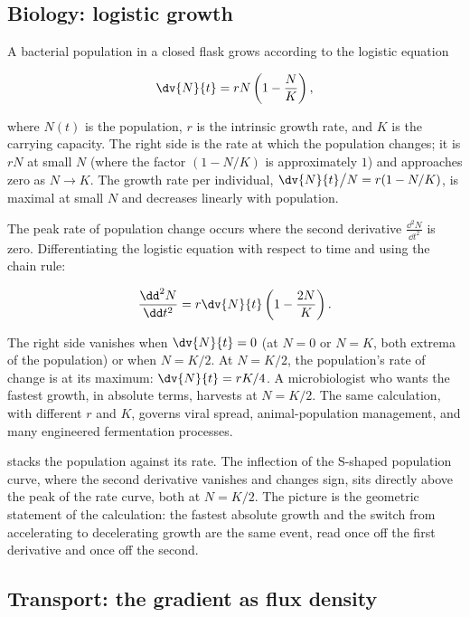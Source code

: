 \subsection{Biology: logistic growth}

A bacterial population in a closed flask grows according to the
logistic equation

\[
\dv{N}{t} = r N \left(1 - \frac{N}{K}\right),
\]

where $N(t)$ is the population, $r$ is the intrinsic growth rate,
and $K$ is the carrying capacity. The right side is the rate at
which the population changes; it is $r N$ at small $N$ (where the
factor $(1 - N/K)$ is approximately $1$) and approaches zero as
$N \to K$. The growth rate per individual, $\dv{N}{t} \big/ N = r
(1 - N/K)$, is maximal at small $N$ and decreases linearly with
population.

The peak rate of population change occurs where the second
derivative $\frac{\dd^{2} N}{\dd t^{2}}$ is zero. Differentiating
the logistic equation with respect to time and using the chain
rule:

\[
\frac{\dd^{2} N}{\dd t^{2}} = r \dv{N}{t} \left(1 - \frac{2 N}
{K}\right).
\]

The right side vanishes when $\dv{N}{t} = 0$ (at $N = 0$ or $N =
K$, both extrema of the population) or when $N = K/2$. At
$N = K/2$, the population's rate of change is at its maximum:
$\dv{N}{t} = r K/4$. A microbiologist who wants the fastest
growth, in absolute terms, harvests at $N = K/2$. The same
calculation, with different $r$ and $K$, governs viral spread,
animal-population management, and many engineered fermentation
processes.



 stacks the population
against its rate. The inflection of the S-shaped population curve,
where the second derivative vanishes and changes sign, sits directly
above the peak of the rate curve, both at $N = K/2$. The picture is
the geometric statement of the calculation: the fastest absolute
growth and the switch from accelerating to decelerating growth are
the same event, read once off the first derivative and once off the
second.

\subsection{Transport: the gradient as flux density}

